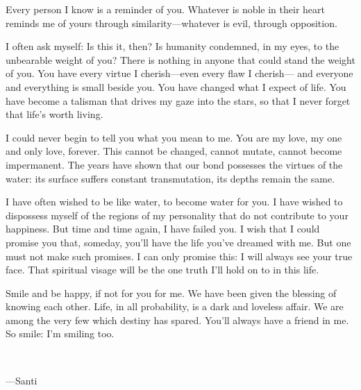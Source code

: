 \documentclass[a4paper, 12pt]{article}
\begin{document}
Every person I know is a reminder of you. Whatever is noble in their heart
reminds me of yours through similarity---whatever is evil, through opposition.

I often ask myself: Is this it, then? Is humanity condemned, in my eyes, to the
unbearable weight of you? There is nothing in anyone that could stand the
weight of you. You have every virtue I cherish---even every flaw I cherish---
and everyone and everything is small beside you. You have changed what I expect
of life. You have become a talisman that drives my gaze into the stars, so that I
never forget that life's worth living.

I could never begin to tell you what you mean to me. You are my love, my one
and only love, forever. This cannot be changed, cannot mutate, cannot become
impermanent. The years have shown that our bond possesses the virtues of the
water: its surface suffers constant transmutation, its depths remain the same.

I have often wished to be like water, to become water for you. I have wished to
dispossess myself of the regions of my personality that do not contribute to
your happiness. But time and time again, I have failed you. I wish that I could
promise you that, someday, you'll have the life you've dreamed with me. But one
must not make such promises. I can only promise this: I will always see your
true face. That spiritual visage will be the one truth I'll hold on to in this
life. 

Smile and be happy, if not for you for me. We have been given the blessing of
knowing each other. Life, in all probability, is a dark and loveless affair. We
are among the very few which destiny has spared. You'll always have a friend in
me. So smile: I'm smiling too.

~ 

---Santi
\end{document}
